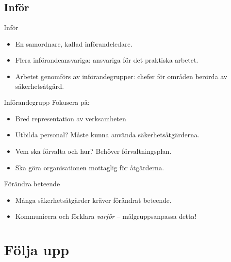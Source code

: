 \documentclass{beamer}
\begin{document}
\subsection{Inför}
\begin{frame}{Inför}
  \begin{itemize}
    \item En samordnare, kallad införandeledare.
    \item Flera införandeansvariga: ansvariga för det praktiska arbetet.
    \item Arbetet genomförs av införandegrupper: chefer för områden berörda av 
      säkerhetsåtgärd.
  \end{itemize}
\end{frame}
\begin{frame}{Införandegrupp}
  Fokusera på:
  \begin{itemize}
    \item Bred representation av verksamheten
    \item Utbilda personal?
      Måste kunna använda säkerhetsåtgärderna.
    \item Vem ska förvalta och hur?
      Behöver förvaltningsplan.
    \item Ska göra organisationen mottaglig för åtgärderna.
  \end{itemize}
\end{frame}
\begin{frame}{Förändra beteende}
  \begin{itemize}
    \item Många säkerhetsåtgärder kräver förändrat beteende.
    \item Kommunicera och förklara \emph{varför} -- målgruppsanpassa detta!
  \end{itemize}
\end{frame}


\section{Följa upp}
\end{document}
